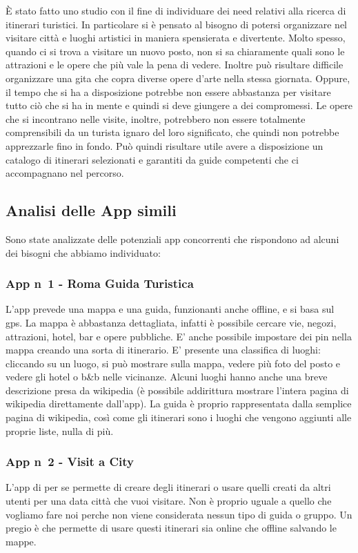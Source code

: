 

È stato fatto uno studio con il fine di individuare dei need relativi alla ricerca
di itinerari turistici. In particolare si è pensato al bisogno di potersi organizzare nel visitare città e
luoghi artistici in maniera spensierata e divertente. Molto spesso, quando ci si trova a 
visitare un nuovo posto, non si sa chiaramente quali sono le attrazioni e le opere che più
vale la pena di vedere. Inoltre può risultare difficile organizzare una gita che copra
diverse opere d'arte nella stessa giornata. Oppure, il tempo che si ha a disposizione potrebbe non
essere abbastanza per visitare tutto ciò che si ha in mente e quindi si deve giungere a dei compromessi.
Le opere che si incontrano nelle visite, inoltre, potrebbero non essere totalmente comprensibili
da un turista ignaro del loro significato, che quindi non potrebbe apprezzarle fino in fondo.
Può quindi risultare utile avere a disposizione un catalogo di itinerari selezionati e
garantiti da guide competenti che ci accompagnano nel percorso.

\subsection*{Analisi delle App simili}

Sono state analizzate delle potenziali app concorrenti che rispondono ad alcuni dei bisogni
che abbiamo individuato:

\subsubsection*{App n\degree \ 1 - Roma Guida Turistica}
L'app prevede una mappa e una guida, funzionanti anche offline, e si basa sul gps.
La mappa è abbastanza dettagliata, infatti è possibile cercare vie,
negozi, attrazioni, hotel, bar e opere pubbliche.
E’ anche possibile impostare dei pin nella mappa creando una sorta di itinerario.
E’ presente una classifica di luoghi: cliccando su un luogo, si può mostrare sulla mappa,
vedere più foto del posto e vedere gli hotel o b\&b nelle vicinanze.
Alcuni luoghi hanno anche una breve descrizione presa da wikipedia
(è possibile addirittura mostrare l’intera pagina di wikipedia direttamente dall’app).
La guida è proprio rappresentata dalla semplice pagina di wikipedia, 
così come gli itinerari sono i luoghi che vengono aggiunti alle proprie liste, nulla di più.

\subsubsection*{App n\degree \ 2 - Visit a City}
L'app di per se permette di creare degli itinerari o usare quelli creati da altri utenti per una data città che vuoi visitare. Non è proprio uguale a quello che vogliamo fare noi perche non viene considerata nessun tipo di guida o gruppo.
Un pregio è che permette di usare questi itinerari sia online che offline salvando le mappe.

